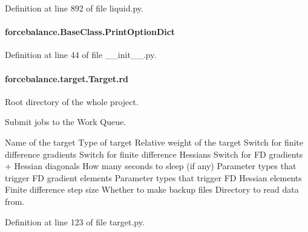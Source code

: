 Definition at line 892 of file liquid.\-py.

\hypertarget{classforcebalance_1_1BaseClass_afc6659278497d7245bc492ecf405ccae}{
\paragraph[{Print\-Option\-Dict}]{\setlength{\rightskip}{0pt plus 5cm}forcebalance.\-Base\-Class.\-Print\-Option\-Dict\hspace{0.3cm}{\ttfamily [inherited]}}}\label{classforcebalance_1_1BaseClass_afc6659278497d7245bc492ecf405ccae}


Definition at line 44 of file \-\_\-\-\_\-init\-\_\-\-\_\-.\-py.

\hypertarget{classforcebalance_1_1target_1_1Target_a4edb69fbde792e9f2f27e54b7c978c8e}{
\paragraph[{rd}]{\setlength{\rightskip}{0pt plus 5cm}forcebalance.\-target.\-Target.\-rd\hspace{0.3cm}{\ttfamily [inherited]}}}\label{classforcebalance_1_1target_1_1Target_a4edb69fbde792e9f2f27e54b7c978c8e}


Root directory of the whole project. 

Submit jobs to the Work Queue.

Name of the target Type of target Relative weight of the target Switch for finite difference gradients Switch for finite difference Hessians Switch for F\-D gradients + Hessian diagonals How many seconds to sleep (if any) Parameter types that trigger F\-D gradient elements Parameter types that trigger F\-D Hessian elements Finite difference step size Whether to make backup files Directory to read data from.

Definition at line 123 of file target.\-py.

